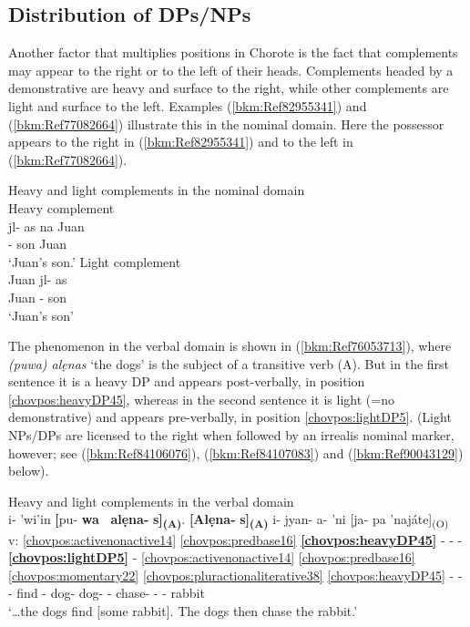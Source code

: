 \documentclass[output=paper]{langscibook}
\begin{document}
\subsection{Distribution of DPs/NPs}
\label{bkm:Ref73306870}
Another factor that multiplies positions in Chorote is the fact that complements may appear to the right or to the left of their heads. Complements headed by a demonstrative are heavy and surface to the right, while other complements are light and surface to the left. Examples (\ref{bkm:Ref82955341}) and (\ref{bkm:Ref77082664}) illustrate this in the nominal domain. Here the possessor appears to the right in (\ref{bkm:Ref82955341}) and to the left in (\ref{bkm:Ref77082664}). 

\ea\label{bkm:Ref82955254} Heavy and light complements in the nominal domain\\ 
    \ea\label{bkm:Ref82955341} Heavy complement \\ {
    \gll jl- as na Juan\\
    \Third\Poss{}- son \Dem{} Juan\\
    \glt `Juan's son.'
    }
    \ex\label{bkm:Ref77082664} Light complement\\ {
    \gll Juan jl- as\\
    Juan \Third\Poss{}- son\\ 
    \glt `Juan's son'
    } 
    \z
\z 


The phenomenon in the verbal domain is shown in (\ref{bkm:Ref76053713}), where \textit{(puwa) alẹnas} `the dogs' is the subject of a transitive verb (A). But in the first sentence it is a heavy DP and appears post-verbally, in position \ref{chovpos:heavyDP45}, whereas in the second sentence it is light (=no demonstrative) and appears pre-verbally, in position \ref{chovpos:lightDP5}. (Light NPs/DPs are licensed to the right when followed by an irrealis nominal marker, however; see (\ref{bkm:Ref84106076}), (\ref{bkm:Ref84107083}) and (\ref{bkm:Ref90043129}) below).


\ea\label{bkm:Ref76053713}Heavy and light complements in the verbal domain \\ 
\glll {} i- 'wi'in \textbf[{pu-} \textbf{wa~} \textbf{alẹna-} \textbf{s]\textsubscript{(A)}}. \textbf{[Alẹna-} \textbf{s]\textsubscript{(A)}} i- jyan- a- 'ni [ja- pa 'najáte]\textsubscript{(O)}\\
v: \ref{chovpos:activenonactive14} \ref{chovpos:predbase16} \textbf{\ref{chovpos:heavyDP45}} - - -   \textbf{\ref{chovpos:lightDP5}} - \ref{chovpos:activenonactive14} \ref{chovpos:predbase16} \ref{chovpos:momentary22} \ref{chovpos:pluractionaliterative38} \ref{chovpos:heavyDP45} - - \\ 
{} \Third{}- find \Dem{}- \Pl{} dog- \Pl{} dog- \Pl{} \Third{}- chase- \Mom{}- \Plact{} \F{}- \Dem{} rabbit\\
\glt {} `…the dogs find [some rabbit]. The dogs then chase the rabbit.' \citep[48]{DraysonGomez2000}
\z 
\end{document}
